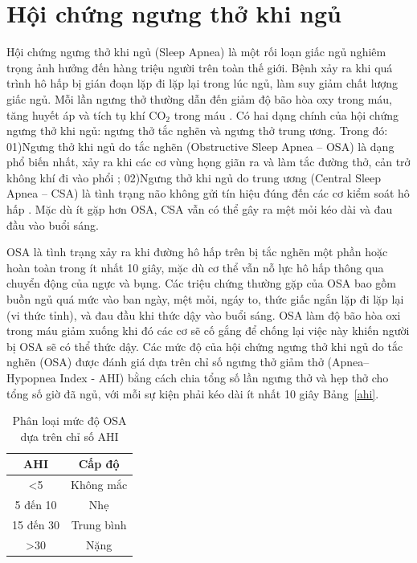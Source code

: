 
\section{Hội chứng ngưng thở khi ngủ}
Hội chứng ngưng thở khi ngủ (Sleep Apnea) là một rối loạn giấc ngủ nghiêm trọng ảnh hưởng đến hàng triệu người trên toàn thế giới. 
Bệnh xảy ra khi quá trình hô hấp bị gián đoạn lặp đi lặp lại trong lúc ngủ, làm suy giảm chất lượng giấc ngủ. 
Mỗi lần ngưng thở thường dẫn đến giảm độ bão hòa oxy trong máu, tăng huyết áp và tích tụ khí CO$_2$
trong máu \cite{ThaySYOSA}. Có hai dạng chính của hội chứng ngưng thở khi ngủ: ngưng thở tắc nghẽn và ngưng thở trung ương. Trong đó: 
01)Ngưng thở khi ngủ do tắc nghẽn (Obstructive Sleep Apnea – OSA) là dạng phổ biến nhất, xảy ra khi các cơ vùng họng giãn ra và làm tắc đường thở, cản trở không khí đi vào phổi \cite{osa_summary}; 
02)Ngưng thở khi ngủ do trung ương (Central Sleep Apnea – CSA) là tình trạng não không gửi tín hiệu đúng đến các cơ kiểm soát hô hấp \cite{eckert2007csa}. Mặc dù ít gặp hơn OSA, CSA vẫn có thể gây ra mệt mỏi kéo dài và đau đầu vào buổi sáng.


\gls{OSA}\cite{osa_summary} là tình trạng xảy ra khi đường hô hấp trên bị tắc nghẽn một phần hoặc hoàn toàn trong ít nhất 10 giây, mặc dù cơ thể vẫn nỗ lực hô hấp thông qua chuyển động của ngực và bụng. Các triệu chứng thường gặp của OSA bao gồm buồn ngủ quá mức vào ban ngày, mệt mỏi, ngáy to, thức giấc ngắn lặp đi lặp lại (vi thức tỉnh), và đau đầu khi thức dậy vào buổi sáng. OSA làm độ bão hòa oxi trong máu giảm xuống khi đó các cơ sẽ cố gắng để chống lại việc này khiến người bị OSA sẽ có thể thức dậy. Các mức độ của hội chứng ngưng thở khi ngủ do tắc nghẽn (OSA) được đánh giá dựa trên chỉ số ngưng thở giảm thở (Apnea–Hypopnea Index - AHI) bằng cách chia tổng số lần ngưng thở và hẹp thở cho tổng số giờ đã ngủ, với mỗi sự kiện phải kéo dài ít nhất 10 giây Bảng~\ref{ahi}.

\begin{table}[h!]
\caption{\texorpdfstring{Phân loại mức độ OSA dựa trên chỉ số AHI}{Phân loại OSA}}
\label{ahi}
\vspace{-3mm}
\begin{center}
\begin{tabular}{|c|c|}
\hline
AHI & Cấp độ \\
\hline
<5 & Không mắc \\
5 đến 10 & Nhẹ \\
15 đến 30 & Trung bình \\
>30 & Nặng \\
\hline
\end{tabular}
\label{tab1}
\end{center}
\end{table}


